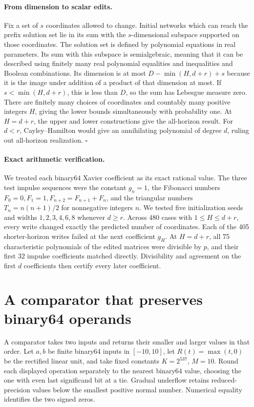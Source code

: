 \paragraph{From dimension to scalar edits.}
Fix a set of \(s\) coordinates allowed to change. Initial networks which can reach the prefix solution set lie in its sum with the \(s\)-dimensional subspace supported on those coordinates. The solution set is defined by polynomial equations in real parameters. Its sum with this subspace is semialgebraic, meaning that it can be described using finitely many real polynomial equalities and inequalities and Boolean combinations. Its dimension is at most \(D-\min(H,d+r)+s\) because it is the image under addition of a product of that dimension at most. If \(s<\min(H,d+r)\), this is less than \(D\), so the sum has Lebesgue measure zero. There are finitely many choices of coordinates and countably many positive integers \(H\), giving the lower bounds simultaneously with probability one. At \(H=d+r\), the upper and lower constructions give the all-horizon result. For \(d<r\), Cayley--Hamilton would give an annihilating polynomial of degree \(d\), ruling out all-horizon realization. \hfill\(\square\)

\paragraph{Exact arithmetic verification.}
We treated each binary64 Xavier coefficient as its exact rational value. The three test impulse sequences were the constant \(g_n=1\), the Fibonacci numbers \(F_0=0,F_1=1,F_{n+2}=F_{n+1}+F_n\), and the triangular numbers \(T_n=n(n+1)/2\) for nonnegative integers \(n\). We tested five initialization seeds and widths \(1,2,3,4,6,8\) whenever \(d\ge r\). Across 480 cases with \(1\le H\le d+r\), every write changed exactly the predicted number of coordinates. Each of the 405 shorter-horizon writes failed at the next coefficient \(g_H\). At \(H=d+r\), all 75 characteristic polynomials of the edited matrices were divisible by \(p\), and their first 32 impulse coefficients matched directly. Divisibility and agreement on the first \(d\) coefficients then certify every later coefficient.

\section{A comparator that preserves binary64 operands}\label{app:sort}
A comparator takes two inputs and returns their smaller and larger values in that order. Let \(a,b\) be finite binary64 inputs in \([-10,10]\), let \(R(t)=\max(t,0)\) be the rectified linear unit, and take fixed constants \(K=2^{537}\), \(M=10\). Round each displayed operation separately to the nearest binary64 value, choosing the one with even last significand bit at a tie. Gradual underflow retains reduced-precision values below the smallest positive normal number. Numerical equality identifies the two signed zeros.


